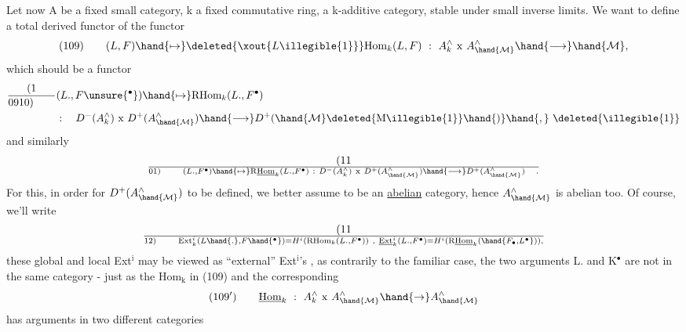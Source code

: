 Let now A be a fixed small category, k a fixed commutative ring,
 a k-additive category,  stable under small inverse limits.  We want to
define a total derived functor of the functor
\[ (109) \qquad (L,F)\hand{\mapsto}\deleted{\xout{L\illegible{1}}}\mathrm{Hom}_k(L,F) \ : \ A^{\wedge}_k \ \mathrm{x} \ A^{\wedge}_{\hand{\mathcal{M}}}\hand{\longrightarrow}\hand{\mathcal{M}}, \]
which should be a functor
\[ \begin{aligned} (1\over{09}{10})\qquad & (L.,F\unsure{^\bullet})\hand{\mapsto}\mathrm{RHom}_k(L.,F^\bullet) \\
& :\quad D^-(A^{\wedge}_k) \ \mathrm{x} \ D^+(A^{\wedge}_{\hand{\mathcal{M}}})\hand{\longrightarrow} D^+(\hand{\mathcal{M}}\deleted{\mathrm{M}\illegible{1}}\hand{)}\hand{,} \ \deleted{\illegible{1}} \end{aligned} \]
and similarly
\[ (11\over{0}{1}) \qquad (L.,F^\bullet)\hand{\mapsto}\mathrm{R}\underline{\mathrm{Hom}}_k(L.,F^\bullet) \ : \ D^-(A^{\wedge}_k) \ \mathrm{x} \ D^+(A^{\wedge}_{\hand{\mathcal{M}}})\hand{\longrightarrow} D^+(A^{\wedge}_{\hand{\mathcal{M}}}) \quad . \]
For this,  in order for $D^+(A^{\wedge}_{\hand{\mathcal{M}}})$  to be defined,  we better assume  to be
an \uline{abelian} category,  hence $A^{\wedge}_{\hand{\mathcal{M}}}$ is abelian too.   Of course, we'll
write
\[ (11\over{1}{2}) \qquad \mathrm{Ext}^i_k(L\hand{.},F\hand{^\bullet}) = H^i(\mathrm{RHom}_k(L.,F^\bullet)) \ , \ \underline{\mathrm{Ext}}^i_k(L.,F^\bullet) = H^i(\mathrm{R}\underline{\mathrm{Hom}}_k(\hand{F_\bullet,L^\bullet})), \]
these global and local Ext$^{\mathrm{i}}$  may be viewed as  ``external'' Ext$^{\mathrm{i}}$'s ,  as
contrarily to the familiar case,  the  two arguments L. and K$^\bullet$  are not
in the same category  -  just as the Hom$_{\mathrm{k}}$ in (109)  and the corresponding
\[ (109') \qquad \underline{\mathrm{Hom}}_k \ : \ A^{\wedge}_k \ \mathrm{x} \ A^{\wedge}_{\hand{\mathcal{M}}}\hand{\to} A^{\wedge}_{\hand{\mathcal{M}}} \]
has arguments in  two different categories 

